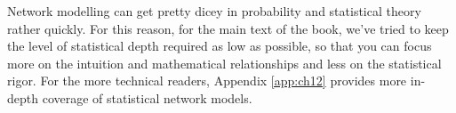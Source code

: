 Network modelling can get pretty dicey in probability and statistical theory rather quickly. For this reason, for the main text of the book, we've tried to keep the level of statistical depth required as low as possible, so that you can focus more on the intuition and mathematical relationships and less on the statistical rigor. For the more technical readers, Appendix \ref{app:ch12} provides more in-depth coverage of statistical network models.

\newpage













